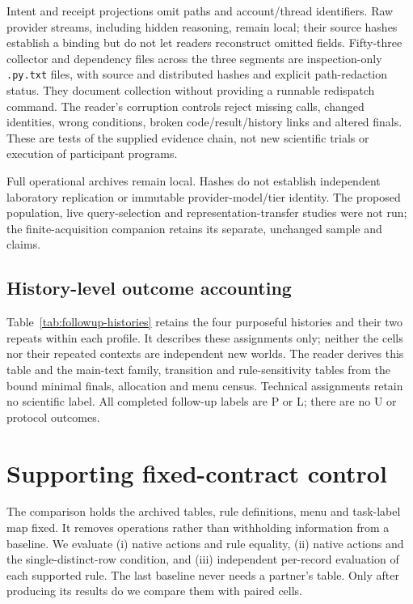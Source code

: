 Intent and receipt projections omit paths and account/thread identifiers.
Raw provider streams, including hidden reasoning, remain local; their source
hashes establish a binding but do not let readers reconstruct omitted fields.
Fifty-three collector and dependency files across the three segments are
inspection-only \texttt{.py.txt} files, with source and distributed hashes and
explicit path-redaction status. They document collection without providing
a runnable redispatch command. The reader's corruption controls reject
missing calls, changed identities, wrong conditions, broken code/result/history
links and altered finals. These are tests of the supplied evidence chain,
not new scientific trials or execution of participant programs.

Full operational archives remain local. Hashes do not establish independent
laboratory replication or immutable provider-model/tier identity. The proposed population,
live query-selection and representation-transfer studies were not run;
the finite-acquisition companion retains its separate, unchanged sample and claims.


\subsection{History-level outcome accounting}
\label{app:followup-history}
Table~\ref{tab:followup-histories} retains the four purposeful histories and
their two repeats within each profile. It describes these assignments only;
neither the cells nor their repeated contexts are independent new worlds.
The reader derives this table and the main-text family, transition and
rule-sensitivity tables from the bound minimal finals, allocation and menu
census. Technical assignments retain no scientific label. All completed
follow-up labels are P or L; there are no U or protocol outcomes.


\section{Supporting fixed-contract control}
\label{app:structural-control}

The comparison holds the archived tables, rule definitions, menu and task-label
map fixed. It removes operations rather than withholding information from a
baseline. We evaluate (i) native actions and rule equality, (ii) native actions
and the single-distinct-row condition, and (iii) independent per-record
evaluation of each supported rule. The last baseline never needs a partner's
table. Only after producing its results do we compare them with paired cells.

